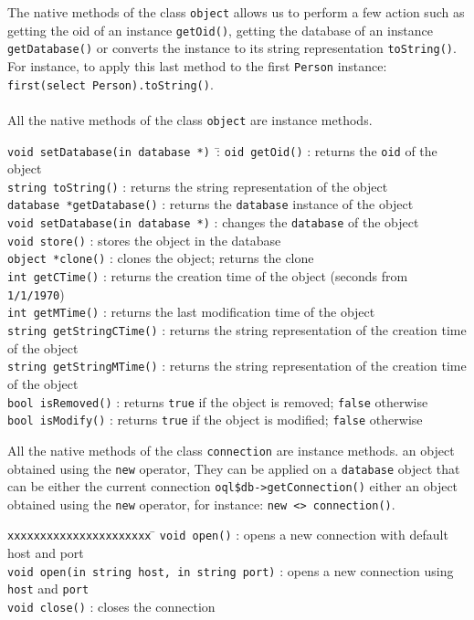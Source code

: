 The native methods of the class \texttt{object} allows us to perform
a few action such as getting the oid of an instance \texttt{getOid()},
getting the database of an instance \texttt{getDatabase()} or
converts the instance to its string representation \texttt{toString()}.
For instance, to apply this last method to the first \texttt{Person} instance:
\texttt{first(select Person).toString()}.\\
\\
All the native methods of the class \texttt{object} are instance methods.
\begin{tabbing}
\texttt{void setDatabase(in database *) }\= : \kill
\texttt{oid getOid()}\> : returns the \texttt{oid} of the object\\
\texttt{string toString()}\> : returns the string representation of the object\\
\texttt{database *getDatabase()}\> : returns the \texttt{database} instance of
the object\\
\texttt{void setDatabase(in database *)}\> : changes the \texttt{database} of the object\\
\texttt{void store()}\> : stores the object in the database \\
\texttt{object *clone()}\> : clones the object; returns the clone \\
\texttt{int getCTime()}\> : returns the creation time of the object (seconds from \texttt{1/1/1970})\\
\texttt{int getMTime()}\> : returns the last modification time of the object\\
\texttt{string getStringCTime()}\> : returns the string representation of
the creation time of the object\\
\texttt{string getStringMTime()}\> : returns the string representation of
the creation time of the object\\
\texttt{bool isRemoved()}\> : returns \texttt{true} if the object is removed;
\texttt{false} otherwise\\
\texttt{bool isModify()}\> :  returns \texttt{true} if the object is modified;
\texttt{false} otherwise\\
\end{tabbing}

All the native methods of the class \texttt{connection} are instance methods.
an object obtained using the \texttt{new} operator,
They can be applied on a \texttt{database} object that can be either the
current connection
\texttt{oql\$db->getConnection()} either an object obtained using the \texttt{new} operator,
for instance: \texttt{new <> connection()}.
\begin{tabbing}
\texttt{xxxxxxxxxxxxxxxxxxxxxx} \= \kill
\texttt{void open()}\> : opens a new connection with default host and port\\
\texttt{void open(in string host, in string port)}\> : opens a new connection
using \texttt{host} and \texttt{port}\\
\texttt{void close()}\> : closes the connection \\
\end{tabbing}

